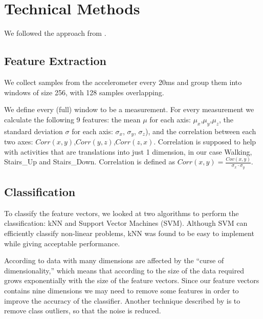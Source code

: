 \section{Technical Methods}
\label{sec:technical-methods}

We followed the approach from \cite{ravi2005activity}. 

\subsection{Feature Extraction}
\label{sec:feature-extraction}
We collect samples from the accelerometer every 20ms and group them into windows of size 256, with 128 samples overlapping.

We define every (full) window to be a measurement.
For every measurement we calculate the following 9 features: the mean $\mu$ for each axis: $\mu_x$,$\mu_y$,$\mu_z$, the standard deviation $\sigma$ for each axis: $\sigma_x$, $\sigma_y$, $\sigma_z$), and the correlation between each two axes:  $Corr(x,y)$,$Corr(y,z)$,$Corr(z,x)$.
Correlation is supposed to help with activities that are translations into just 1 dimension, in our case Walking, Stairs\_Up and Stairs\_Down.
Correlation is defined as $
	Corr(x,y) = \frac{Cov(x,y)}{\sigma_x \cdot \sigma_y}$.

\subsection{Classification}
\label{sec:classification}
To classify the feature vectors, we looked at two algorithms to perform the classification: kNN and Support Vector Machines (SVM). Although SVM can efficiently classify non-linear problems, kNN was found to be easy to implement while giving acceptable performance.

According to \cite{wikipedia1} data with many dimensions are affected by the ``curse of dimensionality,'' which means that according to \cite{wikipedia2} the size of the data required grows exponentially with the size of the feature vectors. Since our feature vectors contains nine dimensions we may need to remove some features in order to improve the accuracy of the classifier. Another technique described by \cite{wikipedia1} is to remove class outliers, so that the noise  is reduced.
